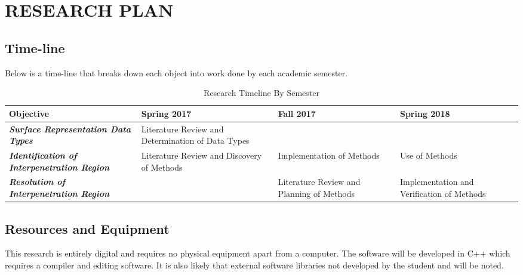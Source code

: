 %
%
%
%



\chapter{RESEARCH PLAN}

\section{Time-line}

Below is a time-line that breaks down each object into work done by each academic semester.

\begin{table}[!htb]

\centering
\caption[Research Timeline By Semester]{Research Timeline By Semester}
\begin{tabular}{|>{\centering\arraybackslash}m{3.7cm}||>{\centering\arraybackslash}m{3.7cm}|>{\centering\arraybackslash}m{3.7cm}|>{\centering\arraybackslash}m{3.7cm}|}
\hline
\textbf{Objective} & \textbf{Spring 2017} & \textbf{Fall 2017} & \textbf{Spring 2018} \\ \hline \hline
\textbf{\textit{Surface Representation Data Types}} & Literature Review and Determination of Data Types &  &  \\ \hline
\textbf{\textit{Identification of Interpenetration Region}} &  Literature Review and Discovery of Methods & Implementation of Methods & Use of Methods \\ \hline
\textbf{\textit{Resolution of Interpenetration Region}} & & Literature Review and Planning of Methods & Implementation and Verification of Methods \\ \hline

\end{tabular}
\end{table}

\section{Resources and Equipment}

This research is entirely digital and requires no physical equipment apart from a computer. The software will be developed in C++ which requires a compiler and editing software. It is also likely that external software libraries not developed by the student and will be noted.


